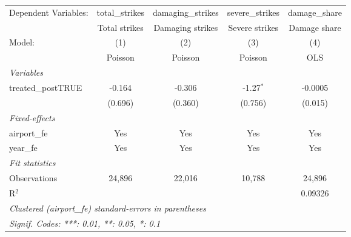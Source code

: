 
\begingroup
\centering
\begin{tabular}{lcccc}
   \tabularnewline \midrule \midrule
   Dependent Variables: & total\_strikes  & damaging\_strikes  & severe\_strikes  & damage\_share\\   
                        & Total strikes   & Damaging strikes   & Severe strikes   & Damage share \\   
   Model:               & (1)             & (2)                & (3)              & (4)\\  
                        &  Poisson        & Poisson            & Poisson          & OLS\\  
   \midrule
   \emph{Variables}\\
   treated\_postTRUE    & -0.164          & -0.306             & -1.27$^{*}$      & -0.0005\\   
                        & (0.696)         & (0.360)            & (0.756)          & (0.015)\\   
   \midrule
   \emph{Fixed-effects}\\
   airport\_fe          & Yes             & Yes                & Yes              & Yes\\  
   year\_fe             & Yes             & Yes                & Yes              & Yes\\  
   \midrule
   \emph{Fit statistics}\\
   Observations         & 24,896          & 22,016             & 10,788           & 24,896\\  
   R$^2$                &                 &                    &                  & 0.09326\\  
   \midrule \midrule
   \multicolumn{5}{l}{\emph{Clustered (airport\_fe) standard-errors in parentheses}}\\
   \multicolumn{5}{l}{\emph{Signif. Codes: ***: 0.01, **: 0.05, *: 0.1}}\\
\end{tabular}
\par\endgroup


